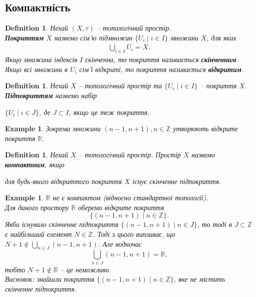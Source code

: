 \documentclass[a4paper, 10pt]{article}
\theoremstyle{theoremdd}
\newtheorem{definition}[theorem]{Definition}
\newtheorem{example}[theorem]{Example}
\begin{document}
\subsection{Компактність}
\begin{definition}
Нехай $(X,\tau)$ -- топологічний простір.\\
\textbf{Покриттям} $X$ назвемо сім'ю підмножин $\{U_i \mid i \in I\}$ множини $X$, для яких
\begin{align*}
\bigcup_{i \in I} U_i = X.
\end{align*}
Якщо множина індексів $I$ скінченна, то покриття називається \textbf{скінченним}. Якщо всі множини в $U_i$ сім'ї відкриті, то покриття називається \textbf{відкритим}.
\end{definition}

\begin{definition}
Нехай $X$ -- топологічний простір та $\{U_i \mid i \in I\}$ -- покриття $X$.\\
\textbf{Підпокриттям} назвемо набір
\begin{center}
$\{U_i \mid i \in J\}$, де $J \subset I$, якщо це теж покриття.
\end{center}
\end{definition}

\begin{example}
Зокрема множини $(n-1,n+1), n \in \mathbb{Z}$ утворюють відкрите покриття $\mathbb{R}$.
\end{example}

\begin{definition}
Нехай $X$ -- топологічний простір.
Простір $X$ назвемо \textbf{компактним}, якщо
\begin{center}
для будь-якого відкриттого покриття $X$ існує скінченне підпокриття.
\end{center}
\end{definition}

\begin{example}
$\mathbb{R}$ не є компактом \textit{(відносно стандартної топології)}.
\bigskip \\
Для даного простору $\mathbb{R}$ оберемо відкрите покриття
\[
\{(n-1,n+1) \mid n \in \mathbb{Z}\}.
\] 
Якби існувало скінченне підпокриття $\{(n-1,n+1) \mid n \in J\}$, то тоді в $J \subset \mathbb{Z}$ є найбільший елемент $N \in \mathbb{Z}$. Тоді з цього випливає, що $N+1 \notin \displaystyle\bigcup_{n \in J} (n-1,n+1)$. Але водночас
\[
\bigcup_{n \in J} (n-1,n+1) = \mathbb{R},
\]
тобто $N+1 \notin \mathbb{R}$ -- це неможливо.\\
Висновок: знайшли покриття $\{(n-1,n+1) \mid n \in \mathbb{Z}\}$, яке не містить скінченне підпокриття.
\end{example}
\end{document}
